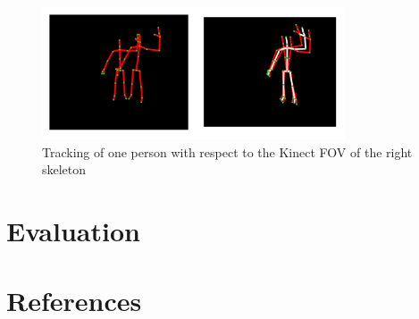 \documentclass[paper=a4, fontsize=11pt]{scrartcl}
\numberwithin{equation}{section}		%
\numberwithin{figure}{section}			%
\numberwithin{table}{section}				%
\begin{document}
\begin{figure}
	\centering
	\includegraphics[width=0.8\textwidth]{fov2_all}
	\caption{Tracking of one person with respect to the Kinect FOV of the right skeleton}
	\label{fig:fov2_all}
\end{figure}

\section{Evaluation}

\section{References}
\end{document}
